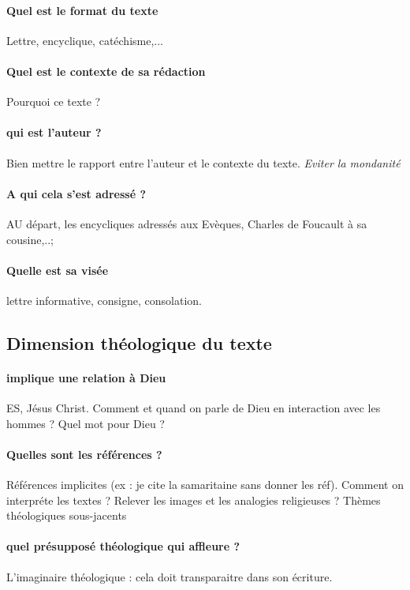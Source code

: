 \paragraph{Quel est le format du texte } Lettre, encyclique, catéchisme,...

\paragraph{Quel est le contexte de sa rédaction} Pourquoi ce texte ?

\paragraph{qui est l'auteur ?} Bien mettre le rapport entre l'auteur et le contexte du texte. \textit{Eviter la mondanité}

\paragraph{A qui cela s'est adressé ?} AU départ, les encycliques adressés aux Evèques, Charles de Foucault à sa cousine,..;

\paragraph{Quelle est sa visée} lettre informative, consigne, consolation.


\subsection{Dimension théologique du texte}

\paragraph{implique une relation à Dieu} ES, Jésus Christ. Comment et quand on parle de Dieu en interaction avec les hommes ? Quel mot pour Dieu ?

\paragraph{Quelles sont les références ? } Références implicites (ex : je cite la samaritaine sans donner les réf). Comment on interpréte les textes ? Relever les images et les analogies religieuses ? 
Thèmes théologiques sous-jacents 

\paragraph{quel présupposé théologique qui affleure ?} L'imaginaire théologique : cela doit transparaitre dans son écriture. 
